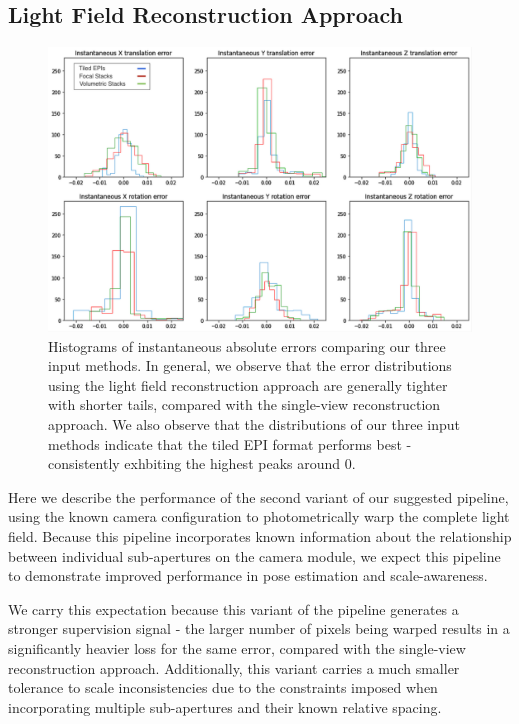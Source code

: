 \newpage


\subsection{Light Field Reconstruction Approach}

\begin{figure}[h]
    \centering
    \includegraphics[width=\textwidth]{images/result-examples/pose/errors/mw_comparison_hist.png}
    \caption[Histogram of instantaneous errors for each input method, using light field reconstruction]{Histograms of instantaneous absolute errors comparing our three input methods. In general, we observe that the error distributions using the light field reconstruction approach are generally tighter with shorter tails, compared with the single-view reconstruction approach. We also observe that the distributions of our three input methods indicate that the tiled EPI format performs best - consistently exhbiting the highest peaks around 0.}
\end{figure}

Here we describe the performance of the second variant of our suggested pipeline, using the known camera configuration to photometrically warp the complete light field. Because this pipeline incorporates known information about the relationship between individual sub-apertures on the camera module, we expect this pipeline to demonstrate improved performance in pose estimation and scale-awareness.

We carry this expectation because this variant of the pipeline generates a stronger supervision signal - the larger number of pixels being warped results in a significantly heavier loss for the same error, compared with the single-view reconstruction approach. Additionally, this variant carries a much smaller tolerance to scale inconsistencies due to the constraints imposed when incorporating multiple sub-apertures and their known relative spacing.

